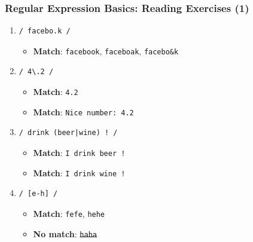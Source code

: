 \documentclass{beamer}
\begin{document}
\begin{frame}[fragile]
    \frametitle{Regular Expression Basics: Reading Exercises (1)}
    \begin{enumerate}
        \item \begin{verbatim}/ facebo.k /\end{verbatim}
        \pause
        \begin{itemize}
            \item \textbf{Match}: \texttt{facebook}, \texttt{faceboak}, \texttt{facebo\&k}
        \end{itemize}
        \item \begin{verbatim}/ 4\.2 /\end{verbatim}
        \pause
        \begin{itemize}
            \item \textbf{Match}: \texttt{4.2}
            \item \textbf{Match}: \texttt{Nice number: 4.2}
        \end{itemize}
        \item \begin{verbatim}/ drink (beer|wine) ! /\end{verbatim}
        \pause
        \begin{itemize}
            \item \textbf{Match}: \texttt{I drink beer !}
            \item \textbf{Match}: \texttt{I drink wine !}
        \end{itemize}
        \item \begin{verbatim}/ [e-h] /\end{verbatim}
        \pause
        \begin{itemize}
            \item \textbf{Match}: \texttt{fefe}, \texttt{hehe}
            \item \textbf{No match}: \st{\texttt{haha}}
        \end{itemize}
    \end{enumerate}
\end{frame}
\end{document}
